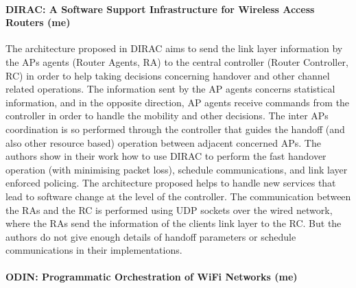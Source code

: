 \documentclass[journal,transmag]{IEEEtran}
\begin{document}
\paragraph{DIRAC: A Software Support Infrastructure for Wireless Access Routers \cite{05DIRAC} (me)}  
The architecture proposed in DIRAC aims to send the link layer information by the APs agents (Router Agents, RA) to the central controller (Router Controller, RC) in order to help taking decisions concerning handover and other channel related operations. The information sent by the AP agents concerns statistical information, and in the opposite direction, AP agents receive commands from the controller in order to handle the mobility and other decisions. The inter APs coordination is so performed through the controller that guides the handoff (and also other resource based) operation between adjacent concerned APs. The authors show in their work how to use DIRAC to perform the fast handover operation (with minimising packet loss), schedule communications, and link layer enforced policing. The architecture proposed helps to handle new services that lead to software change at the level of the controller. The communication between the RAs and the RC is performed using UDP sockets over the wired network, where the RAs send the information of the clients link layer to the RC. But the authors do not give enough details of handoff parameters or schedule communications in their implementations. \\  %

\paragraph{ODIN: Programmatic Orchestration of WiFi Networks 
\cite{14Odin:Programmatic_Orchestration_WiFi,13Odin_poster,12ODIN_entreprise_LAN,12ODIN_demo} (me)}
\end{document}
